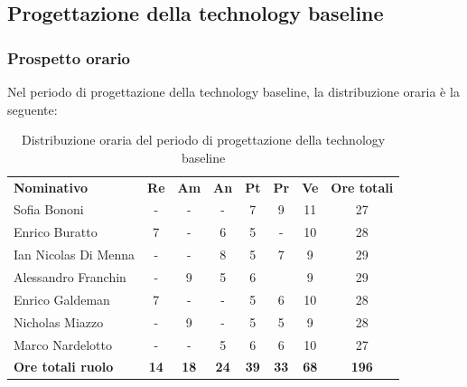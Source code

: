 \documentclass[../piano-di-progetto.tex]{subfiles}
\begin{document}
  \subsection{Progettazione della technology baseline}

  \subsubsection{Prospetto orario}
  Nel periodo di progettazione della technology baseline, la distribuzione oraria è la seguente:
  \begin{table}[H]
    \centering
    \begin{tabular}{lccccccc}
      \rowcolor{lightgray}
      \textbf{Nominativo}        & \textbf{Re} & \textbf{Am}  & \textbf{An} & \textbf{Pt}  & \textbf{Pr}   & \textbf{Ve} & \textbf{Ore totali} \\
      Sofia Bononi              & -           & -           & -           & 7           & 9           & 11          & 27           \\
      Enrico Buratto            & 7           & -           & 6           & 5           & -           & 10          & 28           \\
      Ian Nicolas Di Menna      & -           & -           & 8           & 5           & 7           & 9           & 29           \\
      Alessandro Franchin       & -           & 9           & 5           & 6           &             & 9           & 29           \\
      Enrico Galdeman           & 7           & -           & -           & 5           & 6           & 10          & 28           \\
      Nicholas Miazzo           & -           & 9           & -           & 5           & 5           & 9           & 28           \\
      Marco Nardelotto          & -           & -           & 5           & 6           & 6           & 10          & 27           \\
      \textbf{Ore totali ruolo} & \textbf{14} & \textbf{18} & \textbf{24} & \textbf{39} & \textbf{33} & \textbf{68} & \textbf{196}
    \end{tabular}
    \caption{Distribuzione oraria del periodo di progettazione della technology baseline}
  \end{table}
\end{document}
